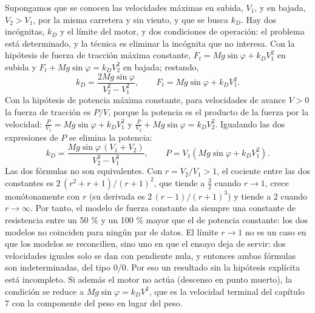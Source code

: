 \documentclass[10pt,openany]{book}
\begin{document}
Supongamos que se conocen las velocidades máximas en subida, \(V_1\), y en bajada, \(V_2 > V_1\), por la misma carretera y sin viento, y que se busca \(k_D\). Hay dos incógnitas, \(k_D\) y el límite del motor, y dos condiciones de operación: el problema está determinado, y la técnica es eliminar la incógnita que no interesa. Con la hipótesis de fuerza de tracción máxima constante, \(F_t = Mg\sin\varphi + k_D V_1^{2}\) en subida y \(F_t + Mg\sin\varphi = k_D V_2^{2}\) en bajada; restando,
\begin{equation}
k_D = \frac{2Mg\sin\varphi}{V_2^{2} - V_1^{2}},\qquad F_t = Mg\sin\varphi + k_D V_1^{2}. \label{eq:c01-fuerza-constante}
\end{equation}
Con la hipótesis de potencia máxima constante, para velocidades de avance \(V>0\) la fuerza de tracción es \(P/V\), porque la potencia es el producto de la fuerza por la velocidad: \(\frac{P}{V_1} = Mg\sin\varphi + k_D V_1^{2}\) y \(\frac{P}{V_2} + Mg\sin\varphi = k_D V_2^{2}\). Igualando las dos expresiones de \(P\) se elimina la potencia:
\begin{equation}
k_D = \frac{Mg\sin\varphi\,(V_1 + V_2)}{V_2^{3} - V_1^{3}},\qquad P = V_1\left(Mg\sin\varphi + k_D V_1^{2}\right). \label{eq:c01-potencia-constante}
\end{equation}
Las dos fórmulas no son equivalentes. Con \(r = V_2/V_1 > 1\), el cociente entre las dos constantes es \(2\,(r^{2} + r + 1)/(r + 1)^{2}\), que tiende a \(\tfrac{3}{2}\) cuando \(r \to 1\), crece monótonamente con \(r\) (su derivada es \(2\,(r - 1)/(r + 1)^{3}\)) y tiende a 2 cuando \(r \to \infty\). Por tanto, el modelo de fuerza constante da siempre una constante de resistencia entre un 50 \% y un 100 \% mayor que el de potencia constante: los dos modelos no coinciden para ningún par de datos. El límite \(r \to 1\) no es un caso en que los modelos se reconcilien, sino uno en que el ensayo deja de servir: dos velocidades iguales solo se dan con pendiente nula, y entonces ambas fórmulas son indeterminadas, del tipo 0/0. Por eso un resultado sin la hipótesis explícita está incompleto. Si además el motor no actúa (descenso en punto muerto), la condición se reduce a \(Mg\sin\varphi = k_D V^{2}\), que es la velocidad terminal del capítulo 7 con la componente del peso en lugar del peso.
\end{document}
